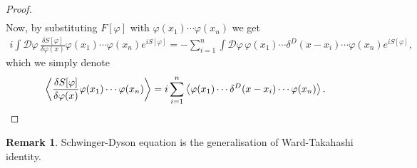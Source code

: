 \documentclass{article}
\theoremstyle{definition}
\newtheorem{remark}{Remark}[section]
\numberwithin{equation}{section}
\newcommand{\fivarphi}{\int \mathscr{D} \varphi\,}
\begin{document}
\begin{proof}
\begin{align}
  \end{align}
  Now, by substituting $F[\varphi]$ with $\varphi(x_1) \cdots \varphi(x_n)$ we get
  \begin{align}
    i\fivarphi \frac{\delta S[\varphi]}{\delta\varphi(x)}  \varphi(x_1) \cdots \varphi(x_n) e^{iS[\varphi]}
    = - \sum_{i = 1}^{n} \fivarphi \varphi(x_1) \cdots \delta^D(x - x_i) \cdots \varphi(x_n) e^{iS[\varphi]},
  \end{align}
  which we simply denote
  \begin{align}
    \ev{\frac{\delta S[\varphi]}{\delta\varphi(x)}  \varphi(x_1) \cdots \varphi(x_n)}
    = i \sum_{i = 1}^{n} \ev{\varphi(x_1) \cdots \delta^D(x - x_i) \cdots \varphi(x_n)}.
  \end{align}
\end{proof}

\begin{remark}
  Schwinger-Dyson equation is the generalisation of Ward-Takahashi identity.
\end{remark}
\end{document}
